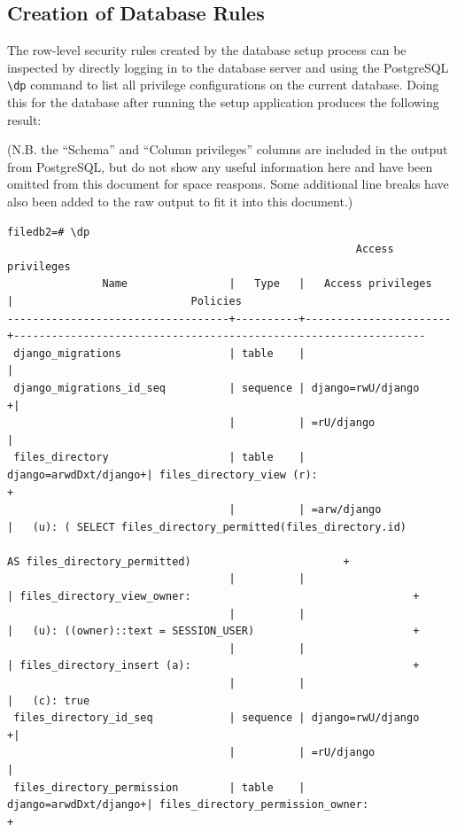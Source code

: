 \documentclass{report}
\begin{document}
\begin{landscape}
  \section{Creation of Database Rules}
  The row-level security rules created by the database setup process can be inspected by directly logging in to the database server and using the PostgreSQL \verb+\dp+ command to list all privilege configurations on the current database. Doing this for the database after running the setup application produces the following result:

  (N.B. the ``Schema'' and ``Column privileges'' columns are included in the output from PostgreSQL, but do not show any useful information here and have been omitted from this document for space reaspons. Some additional line breaks have also been added to the raw output to fit it into this document.)
  {\small
\begin{verbatim}
filedb2=# \dp
                                                       Access privileges
               Name                |   Type   |   Access privileges   |                            Policies
-----------------------------------+----------+-----------------------+-----------------------------------------------------------------
 django_migrations                 | table    |                       |
 django_migrations_id_seq          | sequence | django=rwU/django    +|
                                   |          | =rU/django            |
 files_directory                   | table    | django=arwdDxt/django+| files_directory_view (r):                                     +
                                   |          | =arw/django           |   (u): ( SELECT files_directory_permitted(files_directory.id)
                                                                                 AS files_directory_permitted)                        +
                                   |          |                       | files_directory_view_owner:                                   +
                                   |          |                       |   (u): ((owner)::text = SESSION_USER)                         +
                                   |          |                       | files_directory_insert (a):                                   +
                                   |          |                       |   (c): true
 files_directory_id_seq            | sequence | django=rwU/django    +|
                                   |          | =rU/django            |
 files_directory_permission        | table    | django=arwdDxt/django+| files_directory_permission_owner:                             +

\end{verbatim}}
\end{landscape}
\end{document}
